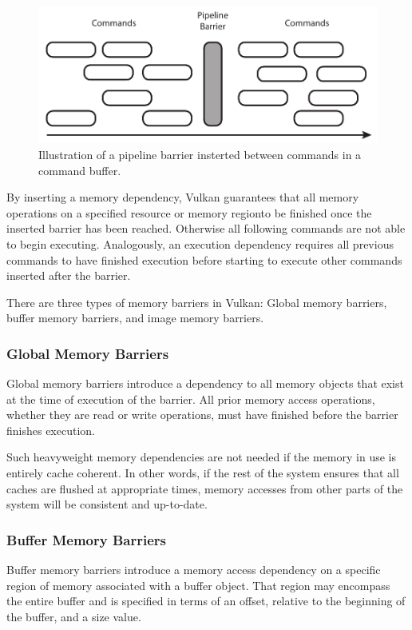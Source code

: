       \begin{figure}
        \centering
        \includegraphics[width=\textwidth]{Main/Images/PipelineBarrier}
        \caption{Illustration of a pipeline barrier insterted between commands in a command buffer.}
        \label{fig:PipelineBarrier}
      \end{figure}

      By inserting a memory dependency, Vulkan guarantees that all memory operations on a specified resource or memory regionto be finished once the inserted barrier has been reached. Otherwise all following commands are not able to begin executing. Analogously, an execution dependency requires all previous commands to have finished execution before starting to execute other commands inserted after the barrier.

      There are three types of memory barriers in Vulkan: Global memory barriers, buffer memory barriers, and image memory barriers.

      \subsubsection{Global Memory Barriers}
        Global memory barriers introduce a dependency to all memory objects that exist at the time of execution of the barrier. All prior memory access operations, whether they are read or write operations, must have finished before the barrier finishes execution.

        Such heavyweight memory dependencies are not needed if the memory in use is entirely cache coherent. In other words, if the rest of the system ensures that all caches are flushed at appropriate times, memory accesses from other parts of the system will be consistent and up-to-date.

      \subsubsection{Buffer Memory Barriers}
        Buffer memory barriers introduce a memory access dependency on a specific region of memory associated with a buffer object. That region may encompass the entire buffer and is specified in terms of an offset, relative to the beginning of the buffer, and a size value.

